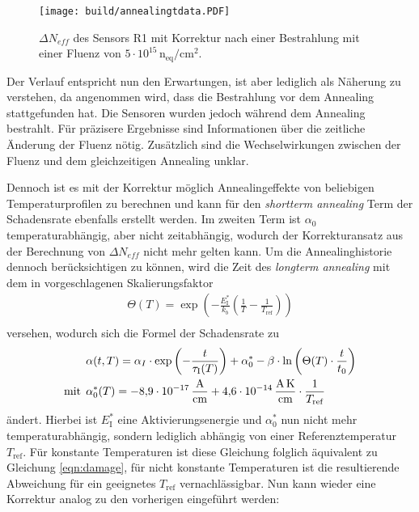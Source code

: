 \begin{figure}[!htb]
  \centering
    \texttt{[image: build/annealingtdata.PDF]}
\caption{$\Delta N_{eff}$ des Sensors R1 mit Korrektur nach einer Bestrahlung mit einer Fluenz von $5\cdot 10^{15} \, \mathrm{n_{eq}/cm^2}$.}
\label{fig:korrektur_N_eff}
\end{figure}



Der Verlauf entspricht nun den Erwartungen, ist aber lediglich als Näherung zu verstehen, da angenommen
wird, dass die Bestrahlung vor dem Annealing stattgefunden hat. Die Sensoren wurden jedoch
während dem Annealing bestrahlt.
Für präzisere Ergebnisse sind Informationen über die zeitliche Änderung der Fluenz nötig.
Zusätzlich sind die Wechselwirkungen zwischen der Fluenz und dem gleichzeitigen Annealing unklar.



Dennoch ist es mit der Korrektur möglich Annealingeffekte von beliebigen Temperaturprofilen zu berechnen und
kann für den \textit{shortterm annealing} Term der Schadensrate ebenfalls erstellt werden.
Im zweiten Term ist $\alpha_{0}$ temperaturabhängig, aber nicht zeitabhängig,
wodurch der Korrekturansatz aus der Berechnung von $\Delta N_{eff}$ nicht mehr gelten kann. Um die Annealinghistorie dennoch
berücksichtigen zu können, wird die Zeit des \textit{longterm annealing} mit dem in \cite{moll} vorgeschlagenen
Skalierungsfaktor
\begin{align}
  \Theta(T) =  \exp{\left(-\frac{E_{\mathrm{I}}^*}{k_b}\left(\frac{1}{T}-\frac{1}{T_{\mathrm{ref}}}\right)\right)} \\
\end{align}
versehen, wodurch sich die Formel der Schadensrate  zu
\begin{align}
  &\alpha(t, T) = \alpha_I \cdot \exp{\left(-\frac{t}{\tau_{\mathrm{I}}(T)}\right)} + \alpha_{\mathrm{0}}^{*} -\beta \cdot \ln{\left(\Theta(T) \cdot \frac{t}{t_{\mathrm{0}}}\right)} \\
  \medskip
  \text{mit}\:\: &\alpha^*_{\mathrm{0}}(T) = \SI{-8.9e-17}{\ampere\per\centi\meter} + \SI{4.6e-14}{\ampere\kelvin\per\centi\meter} \cdot \frac{1}{T_{\mathrm{ref}}}
\end{align}
ändert.
Hierbei ist $E_{\mathrm{I}}^*$ eine Aktivierungsenergie und $\alpha^*_{0}$ nun nicht mehr temperaturabhängig,
sondern lediglich abhängig von einer Referenztemperatur $T_{\mathrm{ref}}$. Für konstante Temperaturen
ist diese Gleichung folglich äquivalent zu Gleichung \ref{eqn:damage}, für nicht
konstante Temperaturen ist die resultierende Abweichung für ein geeignetes $T_{\mathrm{ref}}$ vernachlässigbar.
Nun kann wieder eine Korrektur analog zu den vorherigen eingeführt werden:

